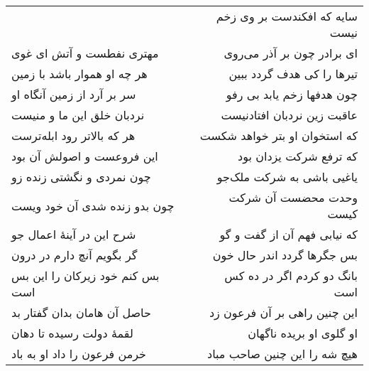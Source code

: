 \begin{center}
\begin{longtable}{l p{0.5cm} r}
&&
سایه که افکندست بر وی زخم نیست
\\
مهتری نفطست و آتش ای غوی
&&
ای برادر چون بر آذر می‌روی
\\
هر چه او هموار باشد با زمین
&&
تیرها را کی هدف گردد ببین
\\
سر بر آرد از زمین آنگاه او
&&
چون هدفها زخم یابد بی رفو
\\
نردبان خلق این ما و منیست
&&
عاقبت زین نردبان افتادنیست
\\
هر که بالاتر رود ابله‌ترست
&&
که استخوان او بتر خواهد شکست
\\
این فروعست و اصولش آن بود
&&
که ترفع شرکت یزدان بود
\\
چون نمردی و نگشتی زنده زو
&&
یاغیی باشی به شرکت ملک‌جو
\\
چون بدو زنده شدی آن خود ویست
&&
وحدت محضست آن شرکت کیست
\\
شرح این در آینهٔ اعمال جو
&&
که نیابی فهم آن از گفت و گو
\\
گر بگویم آنچ دارم در درون
&&
بس جگرها گردد اندر حال خون
\\
بس کنم خود زیرکان را این بس است
&&
بانگ دو کردم اگر در ده کس است
\\
حاصل آن هامان بدان گفتار بد
&&
این چنین راهی بر آن فرعون زد
\\
لقمهٔ دولت رسیده تا دهان
&&
او گلوی او بریده ناگهان
\\
خرمن فرعون را داد او به باد
&&
هیچ شه را این چنین صاحب مباد
\\
\end{longtable}
\end{center}
